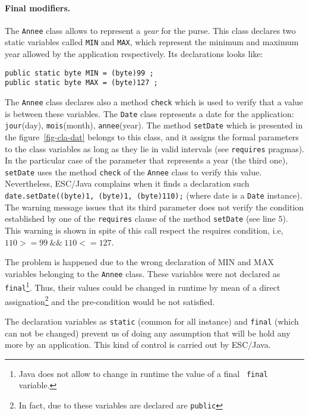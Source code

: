 \documentclass[a4paper]{llncs}
\begin{document}
\paragraph{Final modifiers.}

The \texttt{Annee} class allows to represent a \textit{year} for the
purse. This class declares two 
static variables called \texttt{MIN} and \texttt{MAX}, which represent
the minimum and maximum year allowed by the application
respectively. Its declarations looks like$:$
\begin{verbatim}
public static byte MIN = (byte)99 ;
public static byte MAX = (byte)127 ;
\end{verbatim}

The \texttt{Annee} class declares also a method \texttt{check} which is used to
verify that a value is between these variables. The \texttt{Date} class
represents a date for the application$:$ \texttt{jour}(day),
\texttt{mois}(month), \texttt{annee}(year). The method
\texttt{setDate} which is presented in the figure~\ref{fig-cla-dat}
belongs to this class, and it assigns the formal parameters to the
class variables as long as they lie in valid intervals (see
\texttt{requires} pragmas). In the particular case of the parameter
that represents a year (the third one), \texttt{setDate} uses the
method \texttt{check} of the \texttt{Annee} class to verify this
value. Nevertheless, ESC/Java complains when it
finds a declaration such
\mbox{\tt date.setDate((byte)1, (byte)1, (byte)110);} (where date is a
\texttt{Date} instance). The warning message issues that its third
parameter does not verify the condition established by one of the
\texttt{requires} clause of the method \texttt{setDate} (see line
$5$). This warning is shown in spite of this call respect the
requires condition, i.e, $110>=99\ \&\&\ 110<= 127$.

The problem is happened due to the wrong declaration of \textsc{MIN}
and \textsc{MAX} variables belonging to the \texttt{Annee}
class. These variables were not declared as \texttt{final}\footnote{{\sc
Java} does not allow to change in runtime the value of a final {\tt
final} variable.}. Thus, their values could be changed in runtime by
mean of a direct assignation\footnote{In fact, due to these variables
are declared are \texttt{public}} and the pre-condition would be not
satisfied. 


The declaration variables as \texttt{static} (common for all instance)
and \texttt{final} (which can not be changed) prevent us of doing
any assumption that will be hold any more by an
application. This kind of control is carried out by
ESC/Java. 
\end{document}
